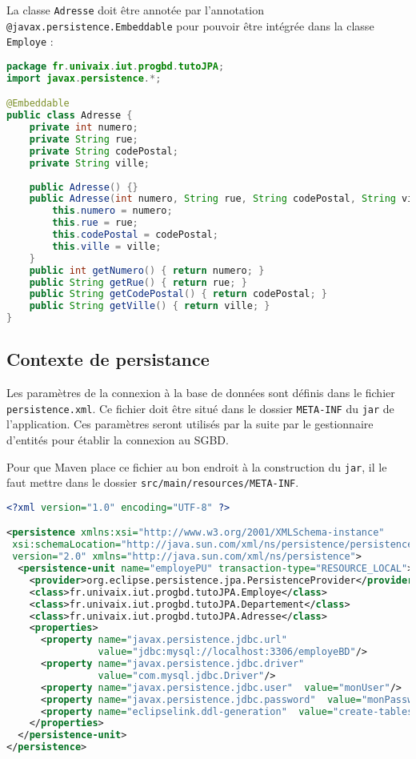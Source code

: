 \documentclass[a4paper,11pt]{article}
\begin{document}
La classe \texttt{Adresse} doit être annotée par l'annotation \texttt{@javax.persistence.Embeddable} pour pouvoir être 
intégrée dans la classe \texttt{Employe} :
\begin{lstlisting}[language=Java,style=customjava]
package fr.univaix.iut.progbd.tutoJPA;
import javax.persistence.*;

@Embeddable
public class Adresse {
	private int numero;
	private String rue;
	private String codePostal;
	private String ville;
		
	public Adresse() {}
	public Adresse(int numero, String rue, String codePostal, String ville) {
		this.numero = numero;
		this.rue = rue;
		this.codePostal = codePostal;
		this.ville = ville;
	}
	public int getNumero() { return numero; }
	public String getRue() { return rue; }
	public String getCodePostal() { return codePostal; }
	public String getVille() { return ville; }
}
\end{lstlisting}
\subsection{Contexte de persistance}
Les paramètres de la connexion à la base de données sont définis dans le fichier \texttt{persistence.xml}. Ce fichier 
doit être situé dans le dossier \texttt{META-INF} du \texttt{jar} de l’application. Ces paramètres seront utilisés par 
la suite par le gestionnaire d'entités pour établir la connexion au SGBD.

Pour que Maven place ce fichier au bon endroit à la construction du \texttt{jar}, il le faut mettre dans le dossier 
\texttt{src/main/resources/META-INF}.

\begin{lstlisting}[language=XML,style=customxml]
<?xml version="1.0" encoding="UTF-8" ?>

<persistence xmlns:xsi="http://www.w3.org/2001/XMLSchema-instance" 
 xsi:schemaLocation="http://java.sun.com/xml/ns/persistence/persistence_2_0.xsd" 
 version="2.0" xmlns="http://java.sun.com/xml/ns/persistence">
  <persistence-unit name="employePU" transaction-type="RESOURCE_LOCAL">
    <provider>org.eclipse.persistence.jpa.PersistenceProvider</provider>
    <class>fr.univaix.iut.progbd.tutoJPA.Employe</class>
    <class>fr.univaix.iut.progbd.tutoJPA.Departement</class>
    <class>fr.univaix.iut.progbd.tutoJPA.Adresse</class>
    <properties>
      <property name="javax.persistence.jdbc.url" 
                value="jdbc:mysql://localhost:3306/employeBD"/>
      <property name="javax.persistence.jdbc.driver" 
                value="com.mysql.jdbc.Driver"/>
      <property name="javax.persistence.jdbc.user"  value="monUser"/>
      <property name="javax.persistence.jdbc.password"  value="monPassword"/>
      <property name="eclipselink.ddl-generation"  value="create-tables"/>
    </properties>
  </persistence-unit>
</persistence>
\end{lstlisting}
\end{document}
